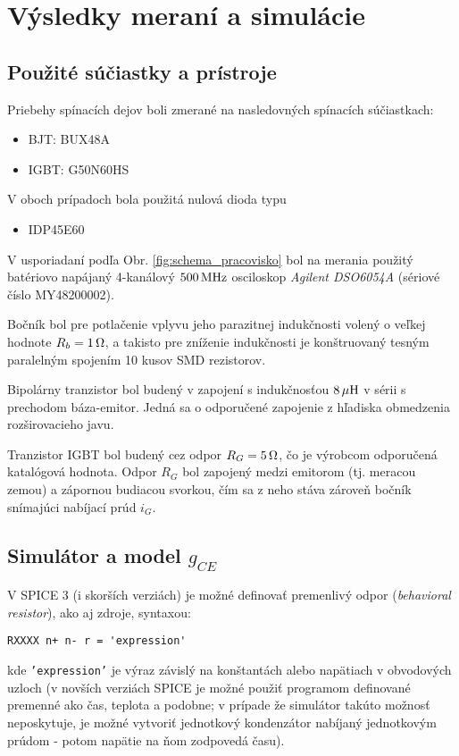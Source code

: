 \chapter{Výsledky meraní a simulácie} \label{ch:vysledky}

\section{Použité súčiastky a prístroje}

Priebehy spínacích dejov boli zmerané na nasledovných spínacích súčiastkach:
\begin{itemize}
    \item BJT: BUX48A
    \item IGBT: G50N60HS
\end{itemize}
V oboch prípadoch bola použitá nulová dioda typu
\begin{itemize}
    \item IDP45E60
\end{itemize}

V usporiadaní podľa Obr. \ref{fig:schema_pracovisko} bol na merania použitý batériovo napájaný 4-kanálový $500\, \mathrm{MHz}$ osciloskop \textit{Agilent DSO6054A} (sériové číslo MY48200002).

Bočník bol pre potlačenie vplyvu jeho parazitnej indukčnosti volený o veľkej hodnote $R_b = 1\, \mathrm{\Omega}$, a takisto pre zníženie indukčnosti je konštruovaný tesným paralelným spojením 10 kusov SMD rezistorov.

Bipolárny tranzistor bol budený v zapojení s indukčnosťou $8\, \mathrm{\mu H}$ v sérii s prechodom báza-emitor. Jedná sa o odporučené zapojenie z hľadiska obmedzenia rozširovacieho javu.

Tranzistor IGBT bol budený cez odpor $R_G = 5 \, \mathrm{\Omega}$, čo je výrobcom odporučená katalógová hodnota. Odpor $R_G$ bol zapojený medzi emitorom (tj. meracou zemou) a zápornou budiacou svorkou, čím sa z neho stáva zároveň bočník snímajúci nabíjací prúd $i_G$.


\newpage
\section{Simulátor a model $g_{CE}$} \label{sec:simulator}

V SPICE 3 (i skorších verziách) je možné definovať premenlivý odpor (\textit{behavioral resistor}), ako aj zdroje, syntaxou:
\begin{verbatim}
RXXXX n+ n- r = 'expression'
\end{verbatim}
kde \texttt{'expression'} je výraz závislý na konštantách alebo napätiach v obvodových uzloch (v novších verziách SPICE je možné použiť programom definované premenné ako čas, teplota a podobne; v prípade že simulátor takúto možnosť neposkytuje, je možné vytvoriť jednotkový kondenzátor nabíjaný jednotkovým prúdom - potom napätie na ňom zodpovedá času).

